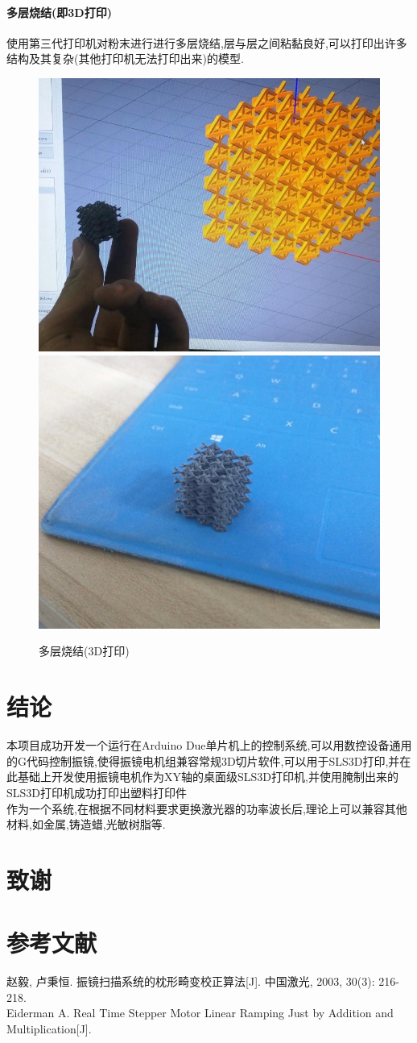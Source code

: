 \documentclass[a4paper,12pt,onecolumn,twoside]{article}
\begin{document}
\paragraph{多层烧结(即3D打印)}
使用第三代打印机对粉末进行进行多层烧结,层与层之间粘黏良好,可以打印出许多结构及其复杂(其他打印机无法打印出来)的模型.
\begin{figure}[ht]
\includegraphics[width=0.49\linewidth]{result2.jpg}
\includegraphics[width=0.49\linewidth]{result3.jpg}
\caption{多层烧结(3D打印)}
\end{figure}
\newpage
\section{结论}
本项目成功开发一个运行在Arduino Due单片机上的控制系统,可以用数控设备通用的G代码控制振镜,使得振镜电机组兼容常规3D切片软件,可以用于SLS3D打印,并在此基础上开发使用振镜电机作为XY轴的桌面级SLS3D打印机,并使用腌制出来的SLS3D打印机成功打印出塑料打印件\\
作为一个系统,在根据不同材料要求更换激光器的功率波长后,理论上可以兼容其他材料,如金属,铸造蜡,光敏树脂等.
\section{致谢}

\section{参考文献}
赵毅, 卢秉恒. 振镜扫描系统的枕形畸变校正算法[J]. 中国激光, 2003, 30(3): 216-218.\\
Eiderman A. Real Time Stepper Motor Linear Ramping Just by Addition and Multiplication[J].\\
\end{document}
